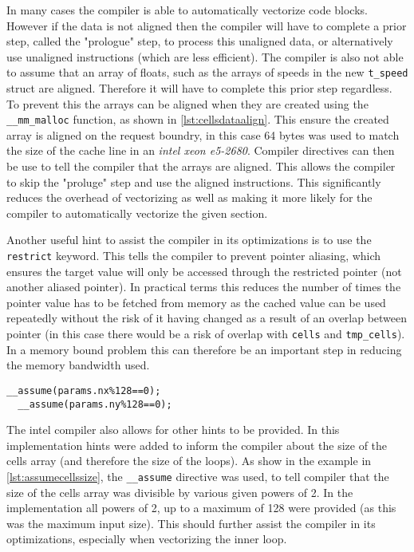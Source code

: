 \documentclass{article}
\begin{document}
\begin{multicols}{2}
In many cases the compiler is able to automatically vectorize code blocks.
However if the data is not aligned then the compiler will have to complete a prior
step, called the "prologue"\cite{vsaac} step, to process this unaligned data, or
alternatively use unaligned instructions (which are less efficient). The
compiler is also not able to assume that an array of floats, such as the arrays
of speeds in the new \verb|t_speed| struct are aligned. Therefore it will have
to complete this prior step regardless. To prevent this the arrays can be
aligned when they are created using the \verb|__mm_malloc| function, as shown in \autoref{lst:cellsdataalign}. This
ensure the created array is aligned on the request boundry, in this case 64
bytes was used to match the size of the cache line in an \emph{intel xeon
e5-2680}. Compiler directives can then be use to tell the compiler that the arrays
are aligned. This allows the compiler to skip the "proluge" step and use the
aligned instructions. This significantly reduces the overhead of vectorizing as
well as making it more likely for the compiler to automatically vectorize the
given section.

Another useful hint to assist the compiler in its optimizations is to use the
\verb|restrict| keyword. This tells the compiler to prevent pointer aliasing,
which ensures the target value will only be accessed through the restricted
pointer (not another aliased pointer). In practical terms this reduces the
number of times the pointer value has to be fetched from memory as the cached
value can be used repeatedly without the risk of it having changed as a result
of an overlap between pointer (in this case there would be a risk of overlap
with \verb|cells| and \verb|tmp_cells|). In a memory bound problem this can
therefore be an important step in reducing the memory bandwidth used.

\begin{lstlisting}[style=CStyle, label={lst:assumecellssize}, caption={Additional compiler hints},]
  __assume(params.nx%128==0);
  __assume(params.ny%128==0);
\end{lstlisting}

The intel compiler also allows for other hints to be provided. In this
implementation hints were added to inform the compiler about the size of the
cells array (and therefore the size of the loops). As show in the example in
\autoref{lst:assumecellssize}, the \verb|__assume| directive was used, to tell
compiler that the size of the cells array was divisible by various given powers of 2.
In the implementation all powers of 2, up to a maximum of 128 were provided (as
this was the maximum input size). This should further assist the compiler in
its optimizations, especially when vectorizing the inner loop.


\end{multicols}
\end{document}

